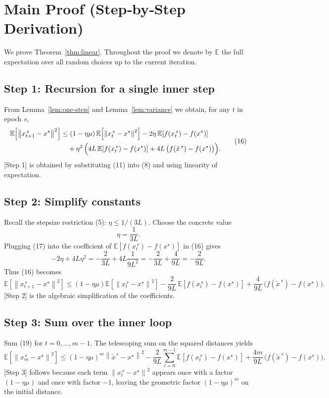 \documentclass{article}
\newcommand{\E}{\mathbb{E}}
\newcommand{\norm}[1]{\left\|#1\right\|}
\begin{document}
\newpage

\section*{Main Proof (Step‑by‑Step Derivation)}
We prove Theorem~\ref{thm:linear}.  Throughout the proof we denote by
\(\E\) the full expectation over all random choices up to the current
iteration.

\subsection*{Step 1: Recursion for a single inner step}
From Lemma~\ref{lem:one-step} and Lemma~\ref{lem:variance} we obtain, for any
\(t\) in epoch \(s\),
\[
\begin{aligned}
\E\!\left[\norm{x_{t+1}^{\,s}-x^{\star}}^{2}\right]
&\le\left(1-\eta\mu\right)\E\!\left[\norm{x_{t}^{\,s}-x^{\star}}^{2}\right]
      -2\eta\,\E\!\left[f(x_{t}^{\,s})-f(x^{\star})\right]   \\
&\quad +\eta^{2}\,
   \Bigl(4L\,\E\!\left[f(x_{t}^{\,s})-f(x^{\star})\right]
        +4L\,\bigl(f(\tilde{x}^{\,s})-f(x^{\star})\bigr)\Bigr).
\end{aligned}
\tag{16}
\]
[Step 1] is obtained by substituting (11) into (8) and using linearity of
expectation.

\subsection*{Step 2: Simplify constants}
Recall the stepsize restriction (5): \(\eta\le 1/(3L)\).  Choose the concrete
value
\[
\eta = \frac{1}{3L}.
\tag{17}
\]
Plugging (17) into the coefficient of
\(\E[f(x_{t}^{\,s})-f(x^{\star})]\) in (16) gives
\[
-2\eta + 4L\eta^{2}
= -\frac{2}{3L} + 4L\frac{1}{9L^{2}}
= -\frac{2}{3L} + \frac{4}{9L}
= -\frac{2}{9L}.
\tag{18}
\]
Thus (16) becomes
\[
\E\!\left[\norm{x_{t+1}^{\,s}-x^{\star}}^{2}\right]
\le\left(1-\eta\mu\right)\E\!\left[\norm{x_{t}^{\,s}-x^{\star}}^{2}\right]
-\frac{2}{9L}\,\E\!\left[f(x_{t}^{\,s})-f(x^{\star})\right]
+\frac{4}{9L}\,\bigl(f(\tilde{x}^{\,s})-f(x^{\star})\bigr).
\tag{19}
\]
[Step 2] is the algebraic simplification of the coefficients.

\subsection*{Step 3: Sum over the inner loop}
Sum (19) for \(t=0,\dots,m-1\).  The telescoping sum on the squared distances
yields
\[
\E\!\left[\norm{x_{m}^{\,s}-x^{\star}}^{2}\right]
\le\left(1-\eta\mu\right)^{m}\norm{\tilde{x}^{\,s}-x^{\star}}^{2}
-\frac{2}{9L}\sum_{t=0}^{m-1}\E\!\left[f(x_{t}^{\,s})-f(x^{\star})\right]
+\frac{4m}{9L}\,\bigl(f(\tilde{x}^{\,s})-f(x^{\star})\bigr).
\tag{20}
\]
[Step 3] follows because each term \(\norm{x_{t}^{\,s}-x^{\star}}^{2}\) appears
once with a factor \((1-\eta\mu)\) and once with factor \(-1\), leaving the
geometric factor \((1-\eta\mu)^{m}\) on the initial distance.
\end{document}
